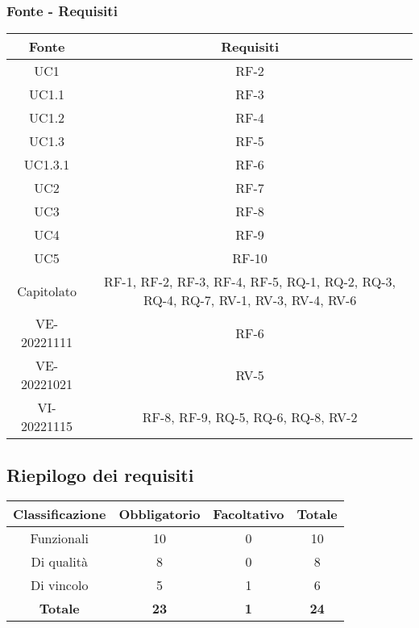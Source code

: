 \subsubsection{Fonte - Requisiti}
\begin{tabular}{| c | c |} 
 \hline
 \textbf{Fonte} & \textbf{Requisiti} \\
 \hline
	UC1 & RF-2\\
\hline
	UC1.1 & RF-3\\
\hline
	UC1.2 & RF-4\\
\hline
	UC1.3 & RF-5\\
\hline
	UC1.3.1 & RF-6\\
\hline
	UC2 & RF-7\\
\hline
	UC3 & RF-8\\
\hline
	UC4 & RF-9\\
\hline
	UC5 & RF-10\\
\hline
	Capitolato & RF-1, RF-2, RF-3, RF-4, RF-5, RQ-1, RQ-2, RQ-3, RQ-4, RQ-7, RV-1, RV-3, RV-4, RV-6\\
\hline
	VE-20221111 & RF-6\\
\hline
	VE-20221021 & RV-5\\
\hline
	VI-20221115 & RF-8, RF-9, RQ-5, RQ-6, RQ-8, RV-2\\
\hline
\end{tabular}

\subsection{Riepilogo dei requisiti}

\begin{tabular}{| c | c | c | c |} 
 \hline
 \textbf{Classificazione} & \textbf{Obbligatorio} & \textbf{Facoltativo} & \textbf{Totale} \\
 \hline
 Funzionali & 10 &  0 & 10\\
 \hline
  Di qualità & 8 & 0 & 8\\
 \hline
 Di vincolo & 5 & 1 & 6\\
 \hline
 \textbf{Totale} & \textbf{23} &\textbf {1} &  \textbf{24}\\
 \hline
\end{tabular}